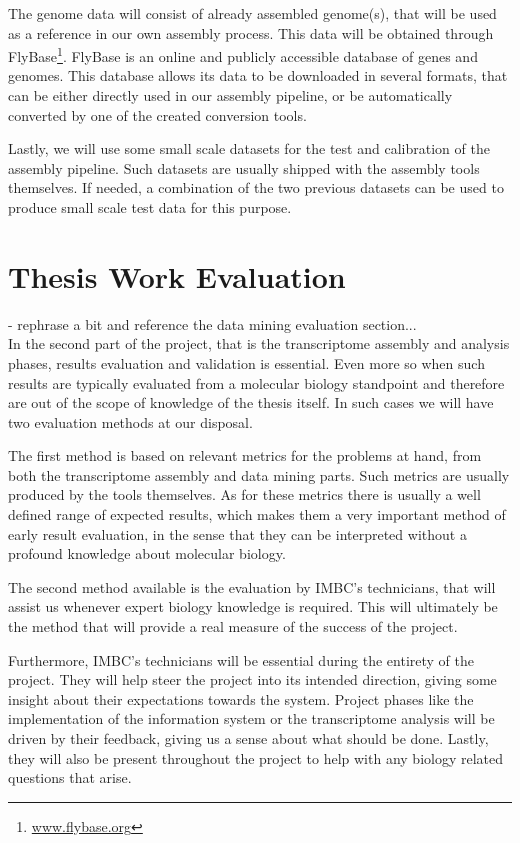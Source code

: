 The genome data will consist of already assembled \fly{} genome(s), that will be
used as a reference in our own assembly process. This data will be obtained
through FlyBase\footnote{\url{www.flybase.org}}. FlyBase is an online and
publicly accessible database of \Fly{} genes and genomes. This database allows
its data to be downloaded in several formats, that can be either directly used
in our assembly pipeline, or be automatically converted by one of the created
conversion tools.

Lastly, we will use some small scale datasets for the test and calibration of the
assembly pipeline. Such datasets are usually shipped with the assembly tools
themselves. If needed, a combination of the two previous datasets can be used to
produce small scale test data for this purpose.

\section{Thesis Work Evaluation}\label{sec:eval}


- rephrase a bit and reference the data mining evaluation section...\\

In the second part of the project, that is the transcriptome assembly and
analysis phases, results evaluation and validation is essential. Even more so
when such results are typically evaluated from a molecular biology standpoint and
therefore are out of the scope of knowledge of the thesis itself. In such cases
we will have two evaluation methods at our disposal.

The first method is based on relevant metrics for the problems at hand, from
both the transcriptome assembly and data mining parts. Such metrics are usually
produced by the tools themselves. As for these metrics there is usually a well
defined range of expected results, which makes them a very important method of early
result evaluation, in the sense that they can be interpreted without a profound
knowledge about molecular biology.

The second method available is the evaluation by IMBC's technicians, that will
assist us whenever expert biology knowledge is required. This will ultimately be
the method that will provide a real measure of the success of the project.

Furthermore, IMBC's technicians will be essential during the entirety of the project. They
will help steer the project into its intended direction, giving some insight
about their expectations towards the system. Project phases like the
implementation of the information system or the transcriptome analysis will be
driven by their feedback, giving us a sense about what should be done. Lastly,
they will also be present throughout the project to help with any biology
related questions that arise.

